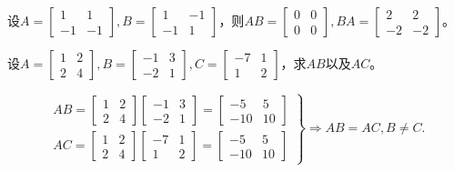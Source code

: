 \begin{eg}
设$A = \begin{bmatrix} 1 & 1 \\ -1 & -1 \end{bmatrix}, B = \begin{bmatrix} 1 & -1 \\ -1 & 1 \end{bmatrix}$，则$AB = \begin{bmatrix} 0 & 0 \\0 & 0 \end{bmatrix}, BA = \begin{bmatrix} 2 & 2 \\ -2 & -2 \end{bmatrix}$。
\end{eg}

\begin{eg}
  设$A = \begin{bmatrix} 1 & 2 \\ 2 & 4 \end{bmatrix}, B = \begin{bmatrix} -1 & 3 \\ -2 & 1 \end{bmatrix}, C = \begin{bmatrix} -7 & 1 \\ 1 & 2 \end{bmatrix}$，求$AB$以及$AC$。
\end{eg}

\begin{solution}
$$\left. \begin{array}{c}
AB = \begin{bmatrix} 1 & 2 \\ 2 & 4 \end{bmatrix} \begin{bmatrix} -1 & 3 \\ -2 & 1 \end{bmatrix} = \begin{bmatrix} -5 & 5 \\ -10 & 10 \end{bmatrix} \\
AC = \begin{bmatrix} 1 & 2 \\ 2 & 4 \end{bmatrix} \begin{bmatrix} -7 & 1 \\ 1 & 2 \end{bmatrix} = \begin{bmatrix} -5 & 5 \\ -10 & 10 \end{bmatrix}
\end{array} \right\} \Rightarrow AB = AC, B \neq C.$$
\end{solution}

